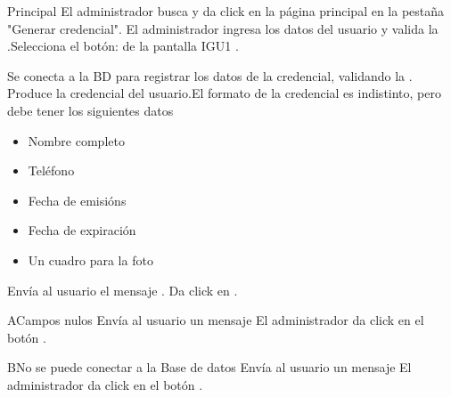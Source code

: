 	\begin{UCtrayectoria}{Principal}
	\UCpaso[\UCactor] El administrador busca y da click en la página principal en la pestaña "Generar credencial".
	\UCpaso[\UCactor] El administrador ingresa los datos del usuario y valida la  .Selecciona el botón:   de la pantalla IGU1 .	

		\UCpaso[\UCsist] Se conecta a la BD para registrar los datos de la credencial, validando la   .
		\UCpaso[\UCsist] Produce la credencial del usuario.El formato de la credencial es indistinto, pero debe tener los siguientes datos
		\begin{itemize}
			\item Nombre completo
			\item Teléfono
			\item Fecha de emisións
			\item Fecha de expiración
			\item Un cuadro para la foto
			
		\end{itemize}		 
		
		\UCpaso[\UCsist] Envía al usuario el mensaje .
		\UCpaso[\UCactor]Da click en .

		\end{UCtrayectoria}		
		\begin{UCtrayectoriaA}{A}{Campos nulos}
			\UCpaso[\UCsist] Envía al usuario un mensaje 
			\UCpaso[\UCsist] El administrador da click en el botón .
		\end{UCtrayectoriaA}

		\begin{UCtrayectoriaA}{B}{No se puede conectar a la Base de datos}
			\UCpaso[\UCsist] Envía al usuario un mensaje 
			\UCpaso[\UCsist] El administrador da click en el botón .
		\end{UCtrayectoriaA}
		

		
				

